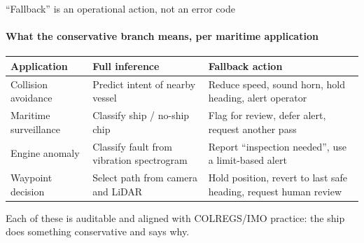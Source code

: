 \documentclass[aspectratio=169, 11pt]{beamer}
\begin{document}
\begin{frame}{``Fallback'' is an operational action, not an error code}
\framesubtitle{What the conservative branch means, per maritime application}

\vspace{0.5em}
\centering
{\small\raggedright
\begin{tabular}{@{}>{\raggedright\arraybackslash}p{} >{\raggedright\arraybackslash}p{} >{\raggedright\arraybackslash}p{}@{}}
\toprule
\textbf{\color{navy}Application} & \textbf{\color{navy}Full inference} & \textbf{\color{navy}Fallback action} \\
\midrule
Collision avoidance & Predict intent of nearby vessel & Reduce speed, sound horn, hold heading, alert operator \\[0.45em]
Maritime surveillance & Classify ship / no-ship chip & Flag for review, defer alert, request another pass \\[0.45em]
Engine anomaly & Classify fault from vibration spectrogram & Report ``inspection needed'', use a limit-based alert \\[0.45em]
Waypoint decision & Select path from camera and LiDAR & Hold position, revert to last safe heading, request human review \\
\bottomrule
\end{tabular}}

\vspace{0.8em}
{\color{ink2}\small Each of these is auditable and aligned with COLREGS/IMO practice: the ship does something conservative and says why.}
\end{frame}
\end{document}
